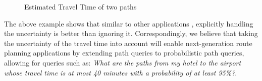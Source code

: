 
\begin{figure}[t]
    \centering
    \vspace{-0.2cm}
    \caption{Estimated Travel Time of two paths}\label{fig:motivation}
    \vspace{-0.5cm}
\end{figure}

The above example shows that similar to other applications
\cite{Sarma08}, explicitly handling the uncertainty is better than ignoring it.
Correspondingly, we believe that taking the uncertainty of the travel time into account will
enable next-generation route planning applications by extending path queries to
probabilistic path queries, allowing for queries such as:  \textit{What are the
paths from my hotel to the airport whose travel time is at most 40 minutes with a probability of at least
95\%?}. 


